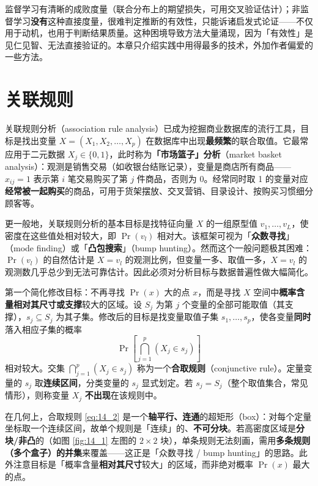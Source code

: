 \begin{remark}[非监督学习没有直接的成功度量]
监督学习有清晰的成败度量（联合分布上的期望损失，可用交叉验证估计）；非监督学习\textbf{没有}这种直接度量，很难判定推断的有效性，只能诉诸启发式论证——不仅用于动机，也用于判断结果质量。这种困境导致方法大量涌现，因为「有效性」是见仁见智、无法直接验证的。本章只介绍实践中用得最多的技术，外加作者偏爱的一些方法。
\end{remark}

\section{关联规则}

关联规则分析（association rule analysis）已成为挖掘商业数据库的流行工具，目标是找出变量 $X=(X_1,X_2,\dots,X_p)$ 在数据库中出现\textbf{最频繁}的联合取值。它最常应用于二元数据 $X_j\in\{0,1\}$，此时称为\textbf{「市场篮子」分析}（market basket analysis）：观测是销售交易（如收银台结账记录），变量是商店所有商品——$x_{ij}=1$ 表示第 $i$ 笔交易购买了第 $j$ 件商品，否则为 0。经常同时取 1 的变量对应\textbf{经常被一起购买}的商品，可用于货架摆放、交叉营销、目录设计、按购买习惯细分顾客等。

更一般地，关联规则分析的基本目标是找特征向量 $X$ 的一组原型值 $v_1,\dots,v_L$，使密度在这些值处相对较大，即 $\Pr(v_l)$ 相对大。该框架可视为「\textbf{众数寻找}」（mode finding）或「\textbf{凸包搜索}」（bump hunting）。然而这个一般问题极其困难：$\Pr(v_l)$ 的自然估计是 $X=v_l$ 的观测比例，但变量一多、取值一多，$X=v_l$ 的观测数几乎总少到无法可靠估计。因此必须对分析目标与数据普遍性做大幅简化。

\begin{definition}[合取规则]
第一个简化修改目标：不再寻找 $\Pr(x)$ 大的点 $x$，而是寻找 $X$ 空间中\textbf{概率含量相对其尺寸或支撑}较大的区域。设 $S_j$ 为第 $j$ 个变量的全部可能取值（其支撑），$s_j\subseteq S_j$ 为其子集。修改后的目标是找变量取值子集 $s_1,\dots,s_p$，使各变量\textbf{同时}落入相应子集的概率
\begin{equation}
\Pr\left[\bigcap_{j=1}^{p} (X_j\in s_j)\right] \label{eq:14_2}
\end{equation}
相对较大。交集 $\bigcap_{j=1}^{p} (X_j\in s_j)$ 称为一个\textbf{合取规则}（conjunctive rule）。定量变量的 $s_j$ 取\textbf{连续区间}，分类变量的 $s_j$ 显式划定。若 $s_j=S_j$（整个取值集合，常见情形），则称变量 $X_j$ \textbf{不出现}在该规则中。
\end{definition}

\begin{remark}
在几何上，合取规则 \eqref{eq:14_2} 是一个\textbf{轴平行、连通}的超矩形（box）：对每个定量坐标取一个连续区间，故单个规则是「连续」的、\textbf{不可分块}。若高密度区域是\textbf{分块/非凸}的（如图 \ref{fig:14_1} 左图的 $2\times 2$ 块），单条规则无法刻画，需用\textbf{多条规则（多个盒子）的并集}来覆盖——这正是「众数寻找 / bump hunting」的思路。此外注意目标是「概率含量\textbf{相对其尺寸}较大」的区域，而非绝对概率 $\Pr(x)$ 最大的点。
\end{remark}

